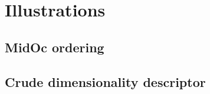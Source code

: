 

\section{Illustrations}
	\subsection{MidOc ordering}
		
		\label{fig:density-variation}
		
		 
		
		
	\subsection{Crude dimensionality descriptor}